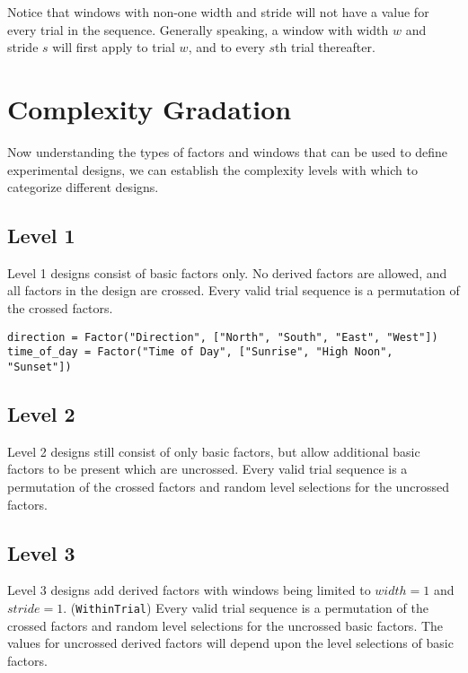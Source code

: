 Notice that windows with non-one width and stride will not have a value for every trial in the sequence. Generally speaking, a window with width $w$ and stride $s$ will first apply to trial $w$, and to every $s$th trial thereafter.



\section{Complexity Gradation}

Now understanding the types of factors and windows that can be used to define experimental designs, we can establish the complexity levels with which to categorize different designs.

\subsection{Level 1}

Level 1 designs consist of basic factors only. No derived factors are allowed, and all factors in the design are crossed. Every valid trial sequence is a permutation of the crossed factors.

\begin{verbatim}
direction = Factor("Direction", ["North", "South", "East", "West"])
time_of_day = Factor("Time of Day", ["Sunrise", "High Noon", "Sunset"])
\end{verbatim}

\subsection{Level 2}

Level 2 designs still consist of only basic factors, but allow additional basic factors to be present which are uncrossed. Every valid trial sequence is a permutation of the crossed factors and random level selections for the uncrossed factors.

\subsection{Level 3}

Level 3 designs add derived factors with windows being limited to $width=1$ and $stride=1$. (\texttt{WithinTrial}) Every valid trial sequence is a permutation of the crossed factors and random level selections for the uncrossed basic factors. The values for uncrossed derived factors will depend upon the level selections of basic factors.

